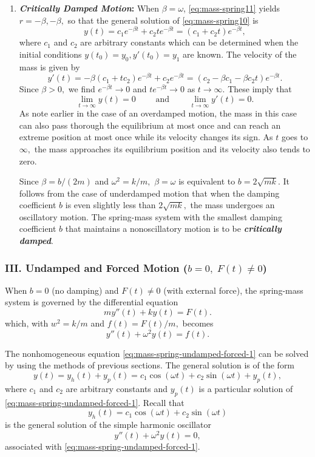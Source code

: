 \begin{enumerate}[leftmargin=1.5em,label = (\arabic*)]
	
\item\label{item:damping1} \textbf{\textit{Critically Damped Motion}:} 
	When $\beta = \omega$,
	 \eqref{eq:mass-spring11} yields  $r = - \beta, -\beta,$ so that the general solution of \eqref{eq:mass-spring10} is
	\[y(t) = c_1 e^{-\beta t}+ c_2 te^{-\beta t} = (c_1+ c_2t) e^{-\beta t},\] where $c_1$ and $c_2$ are arbitrary constants  which can be determined when the initial conditions $y(t_0) = y_0,  y'(t_0) = y_1$ are known.  The velocity of the mass is given by 
	\[y'(t) = -\beta (c_1 + tc_2) e^{-\beta t} + c_2 e^{-\beta t} = (c_2 - \beta c_1- \beta c_2 t) e^{-\beta t}.\]  Since $\beta >0,$ we find $e^{-\beta t}\to 0$ and $t e^{-\beta t}\to 0$ as $t\to\infty.$  These imply that 
	\[\lim\limits_{t\to\infty} y(t) = 0 \qquad \mbox{ and }\qquad \lim\limits_{t\to\infty} y'(t) = 0.\]
As note earlier in the case of an overdamped motion, the mass in this case can also pass thorough the equilibrium at most once and can reach an extreme position at most once while its velocity changes its sign.  As $t$ goes to $\infty,$ the mass approaches its equilibrium position and its velocity also tends to zero.

\medskip Since $\beta = b/(2m)$ and $\omega^2 = k/m,$ $\beta = \omega$ is equivalent to  $b= 2\sqrt{mk}.$ It follows
from the case of underdamped motion  that when the damping coefficient $b$ is even slightly less than  $2\sqrt{mk},$ the mass undergoes  an oscillatory motion. The spring-mass system with the smallest damping  coefficient  $b$ that maintains a nonoscillatory motion is  to be \textbf{\textit{critically damped}}.
\end{enumerate}	

\subsubsection{III. Undamped and Forced Motion ($b=0, \; F(t) \ne 0$)}
When $b=0$ (no damping) and $F(t) \ne 0$ (with external force), the spring-mass system is governed by the differential equation
\begin{equation*}
	my''(t)  + ky(t) = F(t).
\end{equation*}
 which, with $w^2 = k/m$ and $f(t) = F(t)/m,$  becomes
 \begin{equation}\label{eq:mass-spring-undamped-forced-1}
 	y''(t)  + \omega^2y(t) = f(t).
 \end{equation}
 
The nonhomogeneous equation \eqref{eq:mass-spring-undamped-forced-1} can be solved by using the methods of previous sections. The general solution  is of the form
\begin{equation}\label{eq:mass-spring13}
	y(t) = y_h(t) + y_p(t) = c_1 \cos(\omega t) + c_2 \sin(\omega t) +y_p(t),
\end{equation}
where $c_1$ and $c_2$ are arbitrary constants and $y_p(t)$ is a particular solution of \eqref{eq:mass-spring-undamped-forced-1}. Recall that 
 \[y_h(t) = c_1 \cos(\omega t) + c_2 \sin(\omega t) \] is the general solution of the  simple harmonic oscillator \[ y''(t)  + \omega^2 y(t)=0,\]  associated with  \eqref{eq:mass-spring-undamped-forced-1}. 

